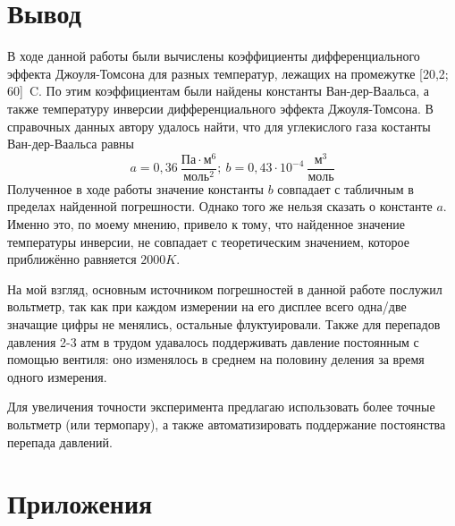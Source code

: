 \documentclass[15pt,a5paper,reqno]{article}
\begin{document}
\section{Вывод}

    В ходе данной работы были вычислены коэффициенты дифференциального эффекта Джоуля-Томсона для разных температур, лежащих на промежутке [20,2; 60]\ \degree C. По этим коэффициентам были найдены константы Ван-дер-Ваальса, а также температуру инверсии дифференциального эффекта Джоуля-Томсона.
    В справочных данных автору удалось найти, что для углекислого газа костанты Ван-дер-Ваальса равны
    \[a = 0,36\ \frac{\text{Па}\cdot\text{м}^6}{\text{моль}^2};\ b = 0,43\cdot10^{-4}\ \frac{\text{м}^3}{\text{моль}}\]
    Полученное в ходе работы значение константы $b$ совпадает с табличным в пределах найденной погрешности. Однако того же нельзя сказать о константе $a$. Именно это, по моему мнению, привело к тому, что найденное значение температуры инверсии, не совпадает с теоретическим значением, которое приближённо равняется $2000 K$.
    
    На мой взгляд, основным источником погрешностей в данной работе послужил вольтметр, так как при каждом измерении на его дисплее всего одна/две значащие цифры не менялись, остальные флуктуировали. Также для перепадов давления 2-3 атм в трудом удавалось поддерживать давление постоянным с помощью вентиля: оно изменялось в среднем на половину деления за время одного измерения.
    
    Для увеличения точности эксперимента предлагаю использовать более точные вольтметр (или термопару), а также автоматизировать поддержание постоянства перепада давлений.
    
\newpage
\section{Приложения}
\end{document}
